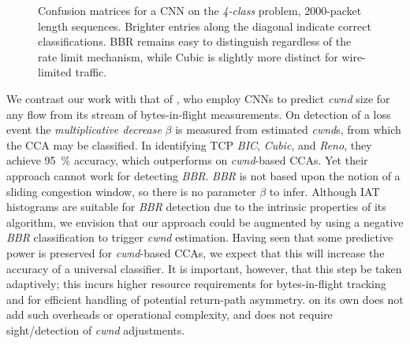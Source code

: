 \begin{figure}
    \caption{Confusion matrices for a CNN on the \emph{4-class} problem, \num{2000}-packet length sequences. Brighter entries along the diagonal indicate correct classifications. BBR remains easy to distinguish regardless of the rate limit mechanism, while Cubic is slightly more distinct for wire-limited traffic.}
    \label{fig:4c-cnn-conf}
    \vspace{-0.6cm}
\end{figure}

We contrast our work with that of \textcite{DBLP:conf/icccn/HagosEYK18}, who employ CNNs to predict \emph{cwnd} size for any flow from its stream of bytes-in-flight measurements.
On detection of a loss event the \emph{multiplicative decrease} $\beta$ is measured from estimated \emph{cwnd}s, from which the CCA may be classified.
In identifying TCP \emph{BIC}, \emph{Cubic}, and \emph{Reno}, they achieve \SI{95}{\percent} accuracy, which outperforms \seidr{} on \emph{cwnd}-based CCAs.
Yet their approach cannot work for detecting \emph{BBR}. 
\emph{BBR} is not based upon the notion of a sliding congestion window, so there is no parameter $\beta$ to infer.
Although IAT histograms are suitable for \emph{BBR} detection due to the intrinsic properties of its algorithm, we envision that our approach could be augmented by using a negative \emph{BBR} classification to trigger \emph{cwnd} estimation.
Having seen that some predictive power is preserved for \emph{cwnd}-based CCAs, we expect that this will increase the accuracy of a universal classifier.
It is important, however, that this step be taken adaptively; this incurs higher resource requirements for bytes-in-flight tracking and for efficient handling of potential return-path asymmetry.
\seidr{} on its own does not add such overheads or operational complexity, and does not require sight/detection of \emph{cwnd} adjustments.

